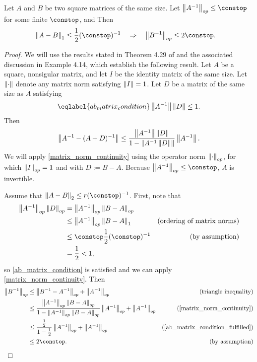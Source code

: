 \begin{prop}
\label{propref:operator_norm_continuity}
%
Let $A$ and $B$ be two square matrices of the same size.
Let $\norm{A^{-1}}_{op}\le \constop$ for some finite $\constop$, and  Then
%
\begin{align*}
\norm{A-B}_{1}\le \frac{1}{2} (\constop)^{-1} &
    \quad\Rightarrow\quad\norm{B^{-1}}_{op} \le 2 \constop.
\end{align*}
%
\begin{proof}
%
We will use the results stated in Theorem 4.29 of \citet{schott:2016:matrix} and
the associated discussion in Example 4.14, which establish the following result.
Let $A$ be a square, nonsigular matrix, and let $I$ be the identity matrix of
the same size.  Let $\left\Vert \cdot\right\Vert$ denote any matrix norm satisfying $\left\Vert I\right\Vert =
1$.  Let $D$ be a matrix of the same size as $A$ satisfying
%
\begin{align}\eqlabel{ab_matrix_condition}
\norm{A^{-1}} \norm{D} \le 1.
\end{align}
%
Then
%
\begin{align}\label{eq:matrix_norm_continuity}
    \left\Vert A^{-1} - (A + D)^{-1}\right\Vert \le
    \frac{\left\Vert A^{-1}\right\Vert\left\Vert D\right\Vert}{1 - \left\Vert A^{-1}\left\Vert D\right\Vert\right\Vert} \left\Vert A^{-1}\right\Vert.
\end{align}
%
We will apply \eqref{matrix_norm_continuity} using the operator norm
$\left\Vert \cdot\right\Vert_{op}$, for which $\left\Vert I\right\Vert_{op}=1$ and with $D := B - A$.
Because $\norm{A^{-1}}_{op}\le \constop$, $A$ is invertible.

Assume that $\norm{A-B}_{2}\le r (\constop)^{-1}$.  First, note that
%
\begin{align}\label{eq:ab_matrix_condition_fulfilled}
\norm{A^{-1}}_{op} \norm{D}_{op} &=
    \norm{A^{-1}}_{op}\norm{B - A}_{op} \nonumber \\
&\le\norm{A^{-1}}_{op}\norm{B - A}_{1}
    & \textrm{(ordering of matrix norms)}\nonumber \\
 & \le \constop \frac{1}{2} (\constop)^{-1}
    & \textrm{(by assumption)} \nonumber \\
&= \frac{1}{2}  < 1,
\end{align}
%
so \eqref{ab_matrix_condition} is satisfied and we can apply
\eqref{matrix_norm_continuity}. Then
%
\begin{align*}
\norm{B^{-1}}_{op}
 & \le \norm{B^{-1}-A^{-1}}_{op} + \norm{A^{-1}}_{op}
    & \textrm{ (triangle inequality)}\\
 & \le \frac{\norm{A^{-1}}_{op}\norm{B - A}_{op}}
            {1 - \norm{A^{-1}}_{op}\norm{B - A}_{op}}
        \norm{A^{-1}}_{op} + \norm{A^{-1}}_{op}
     & \textrm{(\eqref{matrix_norm_continuity})}\\
 & \le \frac{\frac{1}{2}}{1-\frac{1}{2}}\norm{A^{-1}}_{op} +
    \norm{A^{-1}}_{op}
    &\textrm{(\eqref{ab_matrix_condition_fulfilled})} \\
 & \le 2 \constop.&\textrm{(by assumption)}
\end{align*}
\end{proof}
%
\end{prop}

